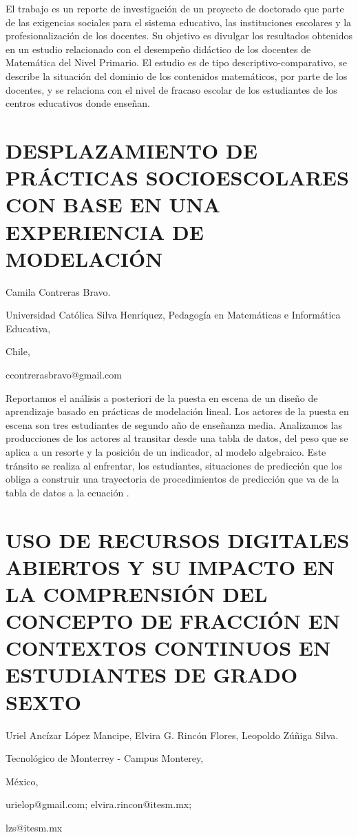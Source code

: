 El trabajo es un reporte de investigación de un proyecto de doctorado
que parte de las exigencias sociales para el sistema educativo, las
instituciones escolares y la profesionalización de los docentes. Su
objetivo es divulgar los resultados obtenidos en un estudio relacionado
con el desempeño didáctico de los docentes de Matemática del Nivel
Primario. El estudio es de tipo descriptivo-comparativo, se describe
la situación del dominio de los contenidos matemáticos, por parte
de los docentes, y se relaciona con el nivel de fracaso escolar de
los estudiantes de los centros educativos donde enseñan.


\section{DESPLAZAMIENTO DE PRÁCTICAS SOCIOESCOLARES CON BASE EN UNA EXPERIENCIA
DE MODELACIÓN}

\begin{datos}

Camila Contreras Bravo. 

Universidad Católica Silva Henríquez, Pedagogía en Matemáticas e Informática
Educativa,

Chile,

ccontrerasbravo@gmail.com 

\end{datos}

Reportamos el análisis a posteriori de la puesta en escena de un diseño
de aprendizaje basado en prácticas de modelación lineal. Los actores
de la puesta en escena son tres estudiantes de segundo año de enseñanza
media. Analizamos las producciones de los actores al transitar desde
una tabla de datos, del peso que se aplica a un resorte y la posición
de un indicador, al modelo algebraico. Este tránsito se realiza al
enfrentar, los estudiantes, situaciones de predicción que los obliga
a construir una trayectoria de procedimientos de predicción que va
de la tabla de datos a la ecuación .


\section{USO DE RECURSOS DIGITALES ABIERTOS Y SU IMPACTO EN LA COMPRENSIÓN
DEL CONCEPTO DE FRACCIÓN EN CONTEXTOS CONTINUOS EN ESTUDIANTES DE
GRADO SEXTO}

\begin{datos}

Uriel Ancízar López Mancipe, Elvira G. Rincón Flores, Leopoldo Zúñiga
Silva.

Tecnológico de Monterrey - Campus Monterey,

México,

urielop@gmail.com; elvira.rincon@itesm.mx;

lzs@itesm.mx

\end{datos}

